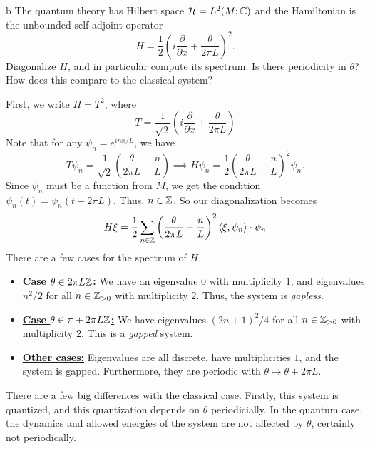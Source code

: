\documentclass{pset}
\theoremstyle{plain}
\begin{document}
\begin{parts}
  \begin{part}{b}
    The quantum theory has Hilbert space $\mathcal{H} = L^2(M; \mathbb{C})$ and the Hamiltonian is the unbounded self-adjoint operator
    \[
      H = \frac{1}{2}\left(i\frac{\partial}{\partial x} + \frac{\theta}{2\pi L}\right)^2.
    \]
    Diagonalize $H$, and in particular compute its spectrum. Is there periodicity in $\theta$? How does this compare to the classical system?
  \end{part}
  First, we write $H=T^2$, where 
  \[
    T = \frac{1}{\sqrt{2}}\left(i\frac{\partial}{\partial x} + \frac{\theta}{2\pi L}\right)
  \]
  Note that for any $\psi_n = e^{inx/L}$, we have
  \[
    T\psi_n = \frac{1}{\sqrt{2}}\left(\frac{\theta}{2\pi L} -\frac{n}{L}\right) \implies H\psi_n = \frac{1}{2}\left(\frac{\theta}{2\pi L} - \frac{n}{L}\right)^2\psi_n.
  \]
  Since $\psi_n$ must be a function from $M$, we get the condition $\psi_n(t) = \psi_n(t+2\pi L)$. Thus, $n\in \mathbb{Z}$. So our diagonalization becomes
  \[
    H \xi = \frac{1}{2}\sum_{n \in \mathbb{Z}} \left(\frac{\theta}{2\pi L} - \frac{n}{L}\right)^2 \langle \xi, \psi_n\rangle \cdot \psi_n
  \]
  There are a few cases for the spectrum of $H$. 

  \begin{itemize}
    \item \textbf{\underline{Case $\theta\in 2\pi L\mathbb{Z}$:}} We have an eigenvalue $0$ with multiplicity $1$, and eigenvalues $n^2/2$ for all $n\in \mathbb{Z}_{>0}$ with multiplicity $2$. Thus, the system is \emph{gapless}.

    \item \textbf{\underline{Case $\theta\in \pi + 2\pi L\mathbb{Z}$:}} We have eigenvalues $(2n+1)^2/4$ for all $n\in \mathbb{Z}_{>0}$ with multiplicity $2$. This is a \emph{gapped} system.

    \item \textbf{\underline{Other cases:}} Eigenvalues are all discrete, have multiplicities $1$, and the system is gapped. Furthermore, they are periodic with $\theta \mapsto \theta + 2\pi L$.
  \end{itemize}
  
  There are a few big differences with the classical case. Firstly, this system is quantized, and this quantization depends on $\theta$ periodicially. In the quantum case, the dynamics and allowed energies of the system are not affected by $\theta$, certainly not periodically.
\end{parts}
\end{document}
